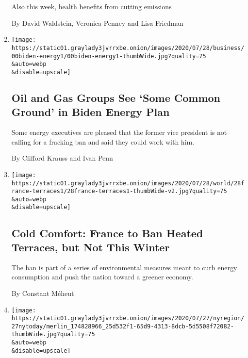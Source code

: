 \begin{enumerate}
  Also this week, health benefits from cutting emissions

  By David Waldstein, Veronica Penney and Lisa Friedman
\item
  \href{/2020/07/28/business/energy-environment/joe-biden-oil-gas-energy.html}{}

  \texttt{[image: https://static01.graylady3jvrrxbe.onion/images/2020/07/28/business/00biden-energy1/00biden-energy1-thumbWide.jpg?quality=75\\\&auto=webp\\\&disable=upscale]}

  \hypertarget{oil-and-gas-groups-see-some-common-ground-in-biden-energy-plan}{%
  \subsection{Oil and Gas Groups See `Some Common Ground' in Biden
  Energy
  Plan}\label{oil-and-gas-groups-see-some-common-ground-in-biden-energy-plan}}

  Some energy executives are pleased that the former vice president is
  not calling for a fracking ban and said they could work with him.

  By Clifford Krauss and Ivan Penn
\item
  \href{/2020/07/28/world/europe/france-heated-terraces-coronavirus.html}{}

  \texttt{[image: https://static01.graylady3jvrrxbe.onion/images/2020/07/28/world/28france-terraces1/28france-terraces1-thumbWide-v2.jpg?quality=75\\\&auto=webp\\\&disable=upscale]}

  \hypertarget{cold-comfort-france-to-ban-heated-terraces-but-not-this-winter}{%
  \subsection{Cold Comfort: France to Ban Heated Terraces, but Not This
  Winter}\label{cold-comfort-france-to-ban-heated-terraces-but-not-this-winter}}

  The ban is part of a series of environmental measures meant to curb
  energy consumption and push the nation toward a greener economy.

  By Constant Méheut
\item
  \href{/2020/07/27/nyregion/nyc-midtown-manhattan-coronavirus.html}{}

  \texttt{[image: https://static01.graylady3jvrrxbe.onion/images/2020/07/27/nyregion/27nytoday/merlin\_174828966\_25d532f1-65d9-4313-8dcb-5d5508f72082-thumbWide.jpg?quality=75\\\&auto=webp\\\&disable=upscale]}


\end{enumerate}
